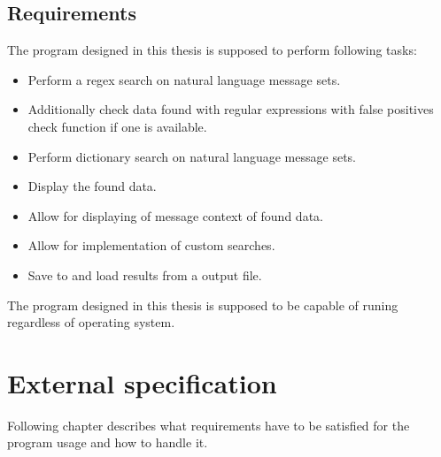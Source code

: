 \documentclass[a4paper,twoside,12pt]{book}
\begin{document}
\section{Requirements}

The program designed in this thesis is supposed to perform following tasks:
\begin{itemize}
   \item Perform a regex search on natural language message sets.
   \item Additionally check data found with regular expressions with false positives check function if one is available.
   \item Perform dictionary search on natural language message sets.
   \item Display the found data.
   \item Allow for displaying of message context of found data.
   \item Allow for implementation of custom searches.
   \item Save to and load results from a output file.
\end{itemize}

The program designed in this thesis is supposed to be capable of runing regardless of operating system.



\chapter{External specification}

Following chapter describes what requirements have to be satisfied for the program usage and how to handle it.
\end{document}
